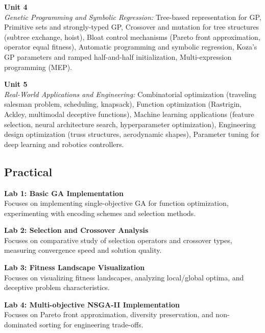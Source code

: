 \noindent\textbf{Unit 4} \\
\textit{Genetic Programming and Symbolic Regression:} Tree-based representation for GP, Primitive sets and strongly-typed GP, Crossover and mutation for tree structures (subtree exchange, hoist), Bloat control mechanisms (Pareto front approximation, operator equal fitness), Automatic programming and symbolic regression, Koza's GP parameters and ramped half-and-half initialization, Multi-expression programming (MEP).

\vspace{0.3cm}

\noindent\textbf{Unit 5} \\
\textit{Real-World Applications and Engineering:} Combinatorial optimization (traveling salesman problem, scheduling, knapsack), Function optimization (Rastrigin, Ackley, multimodal deceptive functions), Machine learning applications (feature selection, neural architecture search, hyperparameter optimization), Engineering design optimization (truss structures, aerodynamic shapes), Parameter tuning for deep learning and robotics controllers.

\newpage

\subsection*{Practical}
\noindent\textbf{Lab 1: Basic GA Implementation} \\
Focuses on implementing single-objective GA for function optimization, experimenting with encoding schemes and selection methods.

\vspace{0.2cm}

\noindent\textbf{Lab 2: Selection and Crossover Analysis} \\
Focuses on comparative study of selection operators and crossover types, measuring convergence speed and solution quality.

\vspace{0.2cm}

\noindent\textbf{Lab 3: Fitness Landscape Visualization} \\
Focuses on visualizing fitness landscapes, analyzing local/global optima, and deceptive problem characteristics.

\vspace{0.2cm}

\noindent\textbf{Lab 4: Multi-objective NSGA-II Implementation} \\
Focuses on Pareto front approximation, diversity preservation, and non-dominated sorting for engineering trade-offs.

